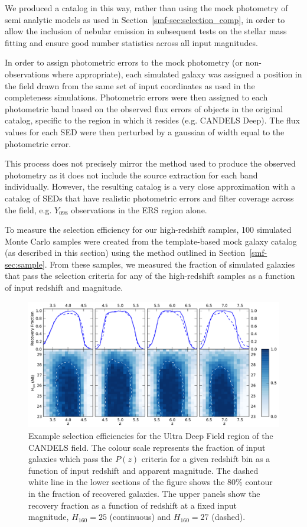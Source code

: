 We produced a catalog in this way, rather than using the mock photometry of semi analytic models as used in Section~\ref{smf-sec:selection_comp}, in order to allow the inclusion of nebular emission in subsequent tests on the stellar mass fitting and ensure good number statistics across all input magnitudes. 

In order to assign photometric errors to the mock photometry (or non-observations where appropriate), each simulated galaxy was assigned a position in the field drawn from the same set of input coordinates as used in the completeness simulations. Photometric errors were then assigned to each photometric band based on the observed flux errors of objects in the original catalog, specific to the region in which it resides (e.g. CANDELS Deep). The flux values for each SED were then perturbed by a gaussian of width equal to the photometric error.

This process does not precisely mirror the method used to produce the observed photometry as it does not include the source extraction for each band individually. However, the resulting catalog is a very close approximation with a catalog of SEDs that have realistic photometric errors and filter coverage across the field, e.g. $Y_{098}$ observations in the ERS region alone. 

To measure the selection efficiency for our high-redshift samples, 100 simulated Monte Carlo samples were created from the template-based mock galaxy catalog (as described in this section) using the method outlined in Section~\ref{smf-sec:sample}. From these samples, we measured the fraction of simulated galaxies that pass the selection criteria for any of the high-redshift samples as a function of input redshift and magnitude.

\begin{figure}
\centering
\includegraphics[width=\textwidth]{plots/fig4.pdf}
\caption[Example selection efficiencies for the Ultra Deep Field region of the CANDELS field.]{Example selection efficiencies for the Ultra Deep Field region of the CANDELS field. The colour scale represents the fraction of input galaxies which pass the $P(z)$ criteria for a given redshift bin as a function of input redshift and apparent magnitude. The dashed white line in the lower sections of the figure shows the 80\% contour in the fraction of recovered galaxies. The upper panels show the recovery fraction as a function of redshift at a fixed input magnitude, $H_{160} = 25$ (continuous) and $H_{160} = 27$ (dashed).}
\label{smf-fig:selection}
\end{figure}

